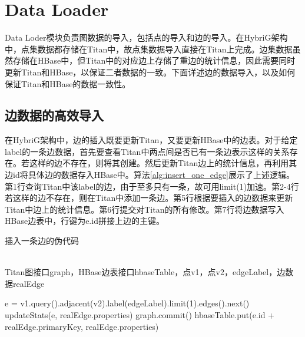 
\chapter{Data Loader}
Data Loder模块负责图数据的导入，包括点的导入和边的导入。在HybriG架构中，点集数据都存储在Titan中，故点集数据导入直接在Titan上完成。边集数据虽然存储在HBase中，但Titan中的对应边上存储了重边的统计信息，因此需要同时更新Titan和HBase，以保证二者数据的一致。下面详述边的数据导入，以及如何保证Titan和HBase的数据一致性。

\section{边数据的高效导入}
在HybriG架构中，边的插入既要更新Titan，又要更新HBase中的边表。对于给定label的一条边数据，首先要查看Titan中两点间是否已有一条边表示这样的关系存在。若这样的边不存在，则将其创建。然后更新Titan边上的统计信息，再利用其边id将具体边的数据存入HBase中。算法\ref{alg:insert_one_edge}展示了上述逻辑。第1行查询Titan中该label的边，由于至多只有一条，故可用limit(1)加速。第2-4行若这样的边不存在，则在Titan中添加一条边。第5行根据要插入的边数据来更新Titan中边上的统计信息。第6行提交对Titan的所有修改。第7行将边数据写入HBase边表中，行键为e.id拼接上边的主键。
\begin{algorithm}
\caption{插入一条边的伪代码}
\label{alg:insert_one_edge}
\begin{algorithmic}[1] %
\REQUIRE ~~\\
Titan图接口graph，HBase边表接口hbaseTable，点v1，点v2，edgeLabel，边数据realEdge

\STATE e = v1.query().adjacent(v2).label(edgeLabel).limit(1).edges().next()
\ENDIF
\STATE updateStats(e, realEdge.properties)
\STATE graph.commit()
\STATE hbaseTable.put(e.id + realEdge.primaryKey, realEdge.properties)
\end{algorithmic} 
\end{algorithm}

